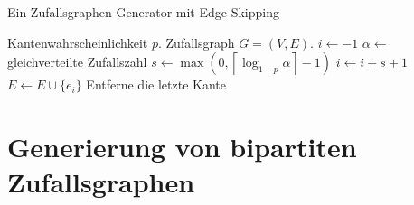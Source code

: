 \documentclass[11pt]{scrreprt} %
\theoremstyle{definition}
\begin{document}
\begin{enumerate}
\begin{algorithm}
\caption{Ein Zufallsgraphen-Generator mit Edge Skipping}
\label{gen.opt}
\begin{algorithmic}
\Require
	\Statex Kantenwahrscheinlichkeit $p$.
\Ensure
	\Statex Zufallsgraph $G = (V, E)$.
\Statex
\Statex $i \gets -1$
\State $\alpha\gets$ gleichverteilte Zufallszahl
\State $s \gets \max(0, \left\lceil \log_{1-p}\alpha\right\rceil - 1)$
\State $i \gets i + s + 1$
\State $E \gets E \cup \{e_i\}$
\EndWhile
\State Entferne die letzte Kante
\end{algorithmic}
\end{algorithm}

\end{enumerate}

\section{Generierung von bipartiten Zufallsgraphen}





\end{document}
